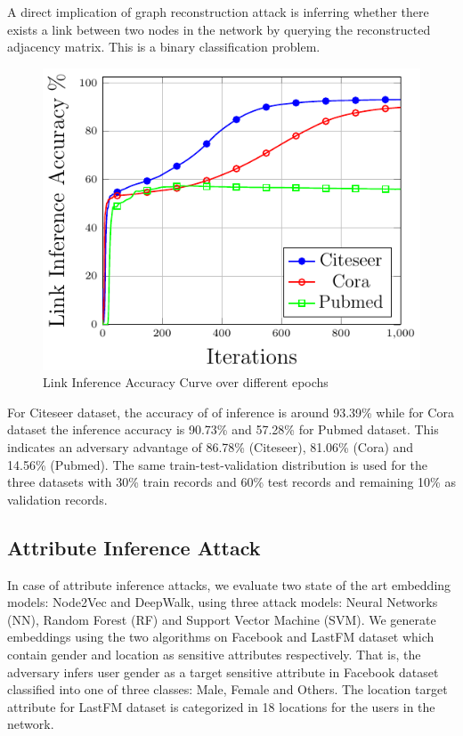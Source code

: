 A direct implication of graph reconstruction attack is inferring whether there exists a link between two nodes in the network by querying the reconstructed adjacency matrix.
This is a binary classification problem.

\begin{figure}
  \begin{center}
    \includegraphics[width=\linewidth]{figures/LinkInfer/LinkInfer.pdf}
  \end{center}
  \caption{Link Inference Accuracy Curve over different epochs}
\end{figure}

For Citeseer dataset, the accuracy of of inference is around 93.39\% while for Cora dataset the inference accuracy is 90.73\% and 57.28\% for Pubmed dataset.
This indicates an adversary advantage of 86.78\% (Citeseer), 81.06\% (Cora) and 14.56\% (Pubmed).
The same train-test-validation distribution is used for the three datasets with 30\% train records and 60\% test records and remaining 10\% as validation records.



\subsection{Attribute Inference Attack}

In case of attribute inference attacks, we evaluate two state of the art embedding models: Node2Vec and DeepWalk, using three attack models: Neural Networks (NN), Random Forest (RF) and Support Vector Machine (SVM).
We generate embeddings using the two algorithms on Facebook and LastFM dataset which contain gender and location as sensitive attributes respectively.
That is, the adversary infers user gender as a target sensitive attribute in Facebook dataset classified into one of three classes: Male, Female and Others.
The location target attribute for LastFM dataset is categorized in 18 locations for the users in the network.

